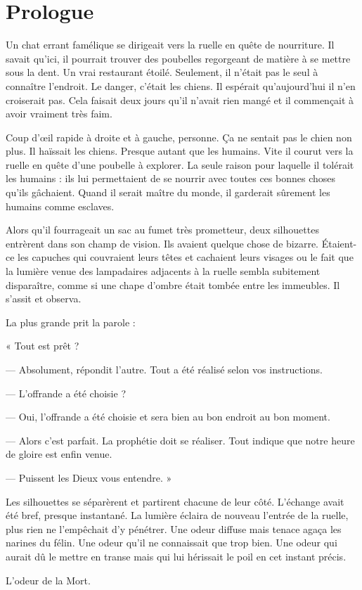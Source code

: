 \chapter[Prologue]{Prologue}
Un chat errant famélique se dirigeait vers la ruelle en quête de nourriture. Il savait qu'ici, il pourrait trouver des 
poubelles regorgeant de matière à se mettre sous la dent. Un vrai restaurant étoilé. Seulement, il n'était pas le 
seul à connaître l'endroit. Le danger, c'était les chiens. Il espérait qu'aujourd'hui il n'en croiserait pas. Cela 
faisait deux jours qu'il n'avait rien mangé et il commençait à avoir vraiment très faim.

Coup d'œil rapide à droite et à gauche, personne. Ça ne sentait pas le chien non plus. Il haïssait les chiens. 
Presque autant que les humains. Vite il courut  vers la ruelle en quête d'une poubelle à explorer. La seule raison 
pour laquelle il tolérait les humains : ils lui permettaient de se nourrir avec toutes ces bonnes choses qu'ils 
gâchaient. Quand il serait maître du monde, il garderait sûrement les humains comme esclaves. 

Alors qu'il fourrageait un sac au fumet très prometteur, deux silhouettes entrèrent dans son champ de vision. Ils 
avaient quelque chose de bizarre. Étaient-ce les capuches qui couvraient leurs têtes et cachaient leurs visages ou
 le fait que la lumière venue des lampadaires adjacents à la ruelle sembla subitement disparaître, comme si une chape 
d'ombre était tombée entre les immeubles. Il s'assit et observa.

La plus grande prit la parole :

« Tout est prêt ?

— Absolument, répondit l'autre. Tout a été réalisé selon vos instructions.

— L'offrande a été choisie ?

— Oui, l'offrande a été choisie et sera bien au bon endroit au bon moment. 

— Alors c'est parfait. La prophétie doit se réaliser. Tout indique que notre heure de gloire est enfin venue. 

— Puissent les Dieux vous entendre. »

Les silhouettes se séparèrent et partirent chacune de leur côté. L'é\-change avait été bref, presque instantané. La 
lumière éclaira de nouveau l'entrée de la ruelle, plus rien ne l'empêchait d'y pénétrer. Une odeur diffuse mais tenace 
agaça les narines du félin. Une odeur qu'il ne connaissait que trop bien. Une odeur qui aurait dû le mettre en transe 
mais qui lui hérissait le poil en cet instant précis.

L'odeur de la Mort.
